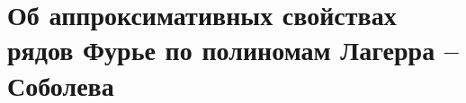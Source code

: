 







% 

% 

\chapter{Об аппроксимативных свойствах рядов Фурье по полиномам Лагерра -- Соболева}

